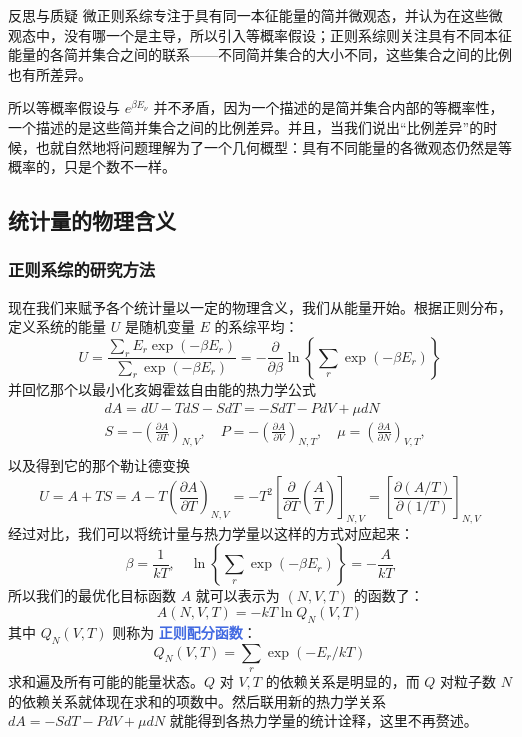 \documentclass[hyperref,UTF-8]{ctexart}
\newcommand{\0}{\boldsymbol{0}}
\begin{document}
\begin{justification}{\kaishu 反思与质疑}
\kaishu \fontsize{11pt}{16pt}
    \quad\quad 微正则系综专注于具有同一本征能量的简并微观态，并认为在这些微观态中，没有哪一个是主导，所以引入等概率假设；正则系综则关注具有不同本征能量的各简并集合之间的联系——不同简并集合的大小不同，这些集合之间的比例也有所差异。

    \quad\quad 所以等概率假设与 $e^{\beta E_\nu}$ 并不矛盾，因为一个描述的是简并集合内部的等概率性，一个描述的是这些简并集合之间的比例差异。并且，当我们说出“比例差异”的时候，也就自然地将问题理解为了一个几何概型：具有不同能量的各微观态仍然是等概率的，只是个数不一样。
\end{justification}

\subsection{统计量的物理含义}

\subsubsection{正则系综的研究方法}
现在我们来赋予各个统计量以一定的物理含义，我们从能量开始。根据正则分布，定义系统的能量 $U$ 是随机变量 $E$ 的系综平均：
\begin{equation}
    U=\frac{\sum_r E_r \exp \left(-\beta E_r\right)}{\sum_r \exp \left(-\beta E_r\right)}=-\frac{\partial}{\partial \beta} \ln \left\{\sum_r \exp \left(-\beta E_r\right)\right\}
\end{equation}
并回忆那个以最小化亥姆霍兹自由能的热力学公式
\[
    \begin{aligned}
& d A=d U-T d S-S d T=-S d T-P d V+\mu d N \\
& S=-\left(\frac{\partial A}{\partial T}\right)_{N, V}, \quad P=-\left(\frac{\partial A}{\partial V}\right)_{N, T}, \quad \mu=\left(\frac{\partial A}{\partial N}\right)_{V, T}, \\
&
\end{aligned}
\]
以及得到它的那个勒让德变换
\[
    U=A+T S=A-T\left(\frac{\partial A}{\partial T}\right)_{N, V}=-T^2\left[\frac{\partial}{\partial T}\left(\frac{A}{T}\right)\right]_{N, V}=\left[\frac{\partial(A / T)}{\partial(1 / T)}\right]_{N, V}
\]
经过对比，我们可以将统计量与热力学量以这样的方式对应起来：
\begin{equation}
    \beta=\frac{1}{k T}, \quad \ln \left\{\sum_r \exp \left(-\beta E_r\right)\right\}=-\frac{A}{k T}
\end{equation}
所以我们的最优化目标函数 $A$ 就可以表示为 $(N,V,T)$ 的函数了：
\begin{equation}
        A(N, V, T)=-k T \ln Q_N(V, T)
\end{equation}
其中 $Q_N(V,T)$ 则称为 \textcolor{RoyalBlue}{\textbf{\kaishu 正则配分函数}}：
\begin{equation}
    Q_N(V, T)=\sum_r \exp \left(-E_r / k T\right)
\end{equation}
求和遍及所有可能的能量状态。$Q$ 对 $V,T$ 的依赖关系是明显的，而 $Q$ 对粒子数 $N$ 的依赖关系就体现在求和的项数中。然后联用新的热力学关系 $d A= -S d T-P d V+\mu d N $ 就能得到各热力学量的统计诠释，这里不再赘述。
\end{document}
